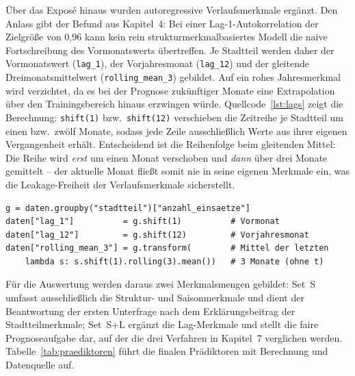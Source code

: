 Über das Exposé hinaus wurden autoregressive Verlaufsmerkmale ergänzt. Den
Anlass gibt der Befund aus Kapitel~4: Bei einer Lag-1-Autokorrelation der
Zielgröße von 0,96 kann kein rein strukturmerkmalbasiertes Modell die naive
Fortschreibung des Vormonatswerts übertreffen. Je Stadtteil werden daher
der Vormonatswert (\texttt{lag\_1}), der Vorjahresmonat (\texttt{lag\_12})
und der gleitende Dreimonatsmittelwert (\texttt{rolling\_mean\_3})
gebildet. Auf ein rohes Jahresmerkmal wird verzichtet, da es bei der
Prognose zukünftiger Monate eine Extrapolation über den Trainingsbereich
hinaus erzwingen würde. Quellcode~\ref{lst:lags} zeigt die Berechnung:
\texttt{shift(1)} bzw.\ \texttt{shift(12)} verschieben die Zeitreihe je
Stadtteil um einen bzw.\ zwölf Monate, sodass jede Zeile ausschließlich
Werte aus ihrer eigenen Vergangenheit erhält. Entscheidend ist die
Reihenfolge beim gleitenden Mittel: Die Reihe wird \emph{erst} um einen
Monat verschoben und \emph{dann} über drei Monate gemittelt -- der aktuelle
Monat fließt somit nie in seine eigenen Merkmale ein, was die
Leakage-Freiheit der Verlaufsmerkmale sicherstellt.

\begin{lstlisting}[caption={Streng vergangenheitsbezogene Lag-Merkmale je
Stadtteil (Ausschnitt aus \texttt{modellierung/demo\_modellierung.py})},
label=lst:lags]
g = daten.groupby("stadtteil")["anzahl_einsaetze"]
daten["lag_1"]          = g.shift(1)          # Vormonat
daten["lag_12"]         = g.shift(12)         # Vorjahresmonat
daten["rolling_mean_3"] = g.transform(        # Mittel der letzten
    lambda s: s.shift(1).rolling(3).mean())   # 3 Monate (ohne t)
\end{lstlisting}

Für die Auswertung werden daraus zwei Merkmalsmengen gebildet: Set~S
umfasst ausschließlich die Struktur- und Saisonmerkmale und dient der
Beantwortung der ersten Unterfrage nach dem Erklärungsbeitrag der
Stadtteilmerkmale; Set~S+L ergänzt die Lag-Merkmale und stellt die faire
Prognoseaufgabe dar, auf der die drei Verfahren in Kapitel~7 verglichen
werden. Tabelle~\ref{tab:praediktoren} führt die finalen Prädiktoren mit
Berechnung und Datenquelle auf.

